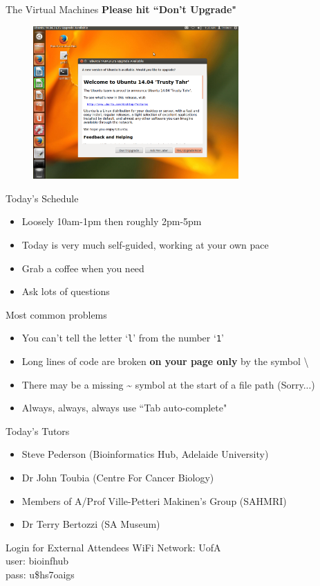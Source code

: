 \documentclass[11pt]{beamer}
\begin{document}
\begin{frame}{The Virtual Machines}
\textbf{Please hit ``Don't Upgrade"}
\begin{figure}[h!]
  \centering
    \includegraphics[width=0.7\textwidth]{images/upgrade.png}
\end{figure}
\end{frame}

\begin{frame}{Today's Schedule}
\begin{itemize}
  \item Loosely 10am-1pm then roughly 2pm-5pm
  \item Today is very much self-guided, working at your own pace
  \item Grab a coffee when you need
  \item Ask lots of questions
\end{itemize}
\end{frame}

\begin{frame}{Most common problems}

\begin{itemize}
\item You can't tell the letter `\texttt{l}' from the number `\texttt{1}'
\item Long lines of code are broken \textbf{on your page only} by the symbol \textbackslash
\item There may be a missing \~{} symbol at the start of a file path (Sorry...)
\item Always, always, always use ``Tab auto-complete"
\end{itemize}

\end{frame}

\begin{frame}{Today's Tutors}
\begin{itemize}
	\item Steve Pederson (Bioinformatics Hub, Adelaide University)
	\item Dr John Toubia (Centre For Cancer Biology)
	\item Members of A/Prof Ville-Petteri Makinen's Group (SAHMRI)
	\item Dr Terry Bertozzi (SA Museum)
\end{itemize}
\end{frame}

\begin{frame}{Login for External Attendees}
WiFi Network: UofA \\
user: bioinfhub \\
pass: u\$hs7oaigs

\end{frame}
\end{document}
